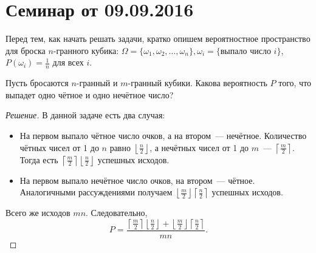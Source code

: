 \documentclass[a4paper,12pt]{article}
\begin{document}
\maketitle

\section{Семинар от 09.09.2016}
Перед тем, как начать решать задачи, кратко опишем вероятностное пространство для броска \(n\)-гранного кубика: \(\Omega = \{\omega_1, \omega_2, \ldots, \omega_n\}, \omega_i = \{\text{выпало число }i\}\), \(P(\omega_i) = \frac{1}{n}\) для всех \(i\).
\begin{problem}
	Пусть бросаются \(n\)-гранный и \(m\)-гранный кубики. Какова вероятность \(P\) того, что выпадет одно чётное и одно нечётное число?
\end{problem}
\begin{proof}[Решение]
	В данной задаче есть два случая:
	\begin{itemize}
		\item На первом выпало чётное число очков, а на втором~--- нечётное. Количество чётных чисел от 1 до \(n\) равно \(\left\lfloor\frac{n}{2}\right\rfloor\), а нечётных чисел от 1 до \(m\)~--- \(\left\lceil\frac{m}{2}\right\rceil\). Тогда есть \(\left\lceil\frac{m}{2}\right\rceil\left\lfloor\frac{n}{2}\right\rfloor\) успешных исходов.
		\item На первом выпало нечётное число очков, на втором~--- чётное. Аналогичными рассуждениями получаем \(\left\lfloor\frac{m}{2}\right\rfloor\left\lceil\frac{n}{2}\right\rceil\) успешных исходов.
	\end{itemize}
	Всего же исходов \(mn\). Следовательно, \[P =\frac{\left\lceil\frac{m}{2}\right\rceil\left\lfloor\frac{n}{2}\right\rfloor + \left\lfloor\frac{m}{2}\right\rfloor\left\lceil\frac{n}{2}\right\rceil}{mn}.\]
\end{proof}
\end{document}
